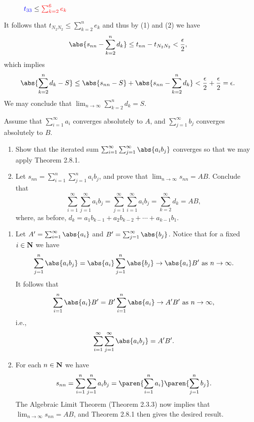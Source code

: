 \documentclass{lew98_solutions}
\begin{document}
\begin{solution}
\begin{enumerate}
\begin{figure}[H]
            \caption{\( \textcolor{blue}{t_{33}} \leq \textcolor{red}{\sum_{k=2}^6 e_k} \)}
            \label{fig:ex2.8.6_2}
        \end{figure}
        \noindent It follows that \( t_{N_2 N_2} \leq \sum_{k=2}^n e_k \) and thus by (1) and (2) we have
        \[
            \abs{s_{nn} - \sum_{k=2}^n d_k} \leq t_{nn} - t_{N_2 N_2} < \frac{\epsilon}{2},
        \]
        which implies
        \[
            \abs{\sum_{k=2}^n d_k - S} \leq \abs{s_{nn} - S} + \abs{s_{nn} - \sum_{k=2}^n d_k} < \frac{\epsilon}{2} + \frac{\epsilon}{2} = \epsilon.
        \]
        We may conclude that \( \lim_{n \to \infty} \sum_{k=2}^n d_k = S \).
    \end{enumerate}
\end{solution}

\begin{exercise}
\label{ex:2.8.7}
    Assume that \( \sum_{i=1}^{\infty} a_i \) converges absolutely to \( A \), and \( \sum_{j=1}^{\infty} b_j \) converges absolutely to \( B \).
    \begin{enumerate}
        \item Show that the iterated sum \( \sum_{i=1}^{\infty} \sum_{j=1}^{\infty} \abs{a_i b_j} \) converges so that we may apply Theorem 2.8.1.

        \item Let \( s_{nn} = \sum_{i=1}^n \sum_{j=1}^n a_i b_j \), and prove that \( \lim_{n \to \infty} s_{nn} = AB \). Conclude that
        \[
            \sum_{i=1}^{\infty} \sum_{j=1}^{\infty} a_i b_j = \sum_{j=1}^{\infty} \sum_{i=1}^{\infty} a_i b_j = \sum_{k=2}^{\infty} d_k = AB,
        \]
        where, as before, \( d_k = a_1 b_{k-1} + a_2 b_{k-2} + \cdots + a_{k-1} b_1 \).
    \end{enumerate}
\end{exercise}

\begin{solution}
    \begin{enumerate}
        \item Let \( A' = \sum_{i=1}^{\infty} \abs{a_i} \) and \( B' = \sum_{j=1}^{\infty} \abs{b_j} \). Notice that for a fixed \( i \in \mathbf{N} \) we have
        \[
            \sum_{j=1}^n \abs{a_i b_j} = \abs{a_i} \sum_{j=1}^n \abs{b_j} \to \abs{a_i} B' \text{ as } n \to \infty.
        \]
        It follows that
        \[
            \sum_{i=1}^n \abs{a_i} B' = B' \sum_{i=1}^n \abs{a_i} \to A' B' \text{ as } n \to \infty,
        \]
        i.e.,
        \[
            \sum_{i=1}^{\infty} \sum_{j=1}^{\infty} \abs{a_i b_j} = A' B'.
        \]

        \item For each \( n \in \mathbf{N} \) we have
        \[
            s_{nn} = \sum_{i=1}^n \sum_{j=1}^n a_i b_j = \paren{ \sum_{i=1}^n a_i } \paren{ \sum_{j=1}^n b_j }.
        \]
        The Algebraic Limit Theorem (Theorem 2.3.3) now implies that \( \lim_{n \to \infty} s_{nn} = AB \), and Theorem 2.8.1 then gives the desired result.
    \end{enumerate}
\end{solution}
\end{document}
